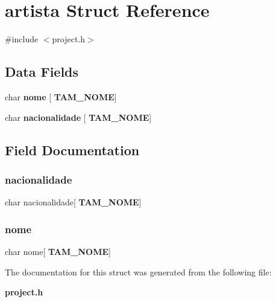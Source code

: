 \section{artista Struct Reference}
\label{structartista}


{\ttfamily \#include $<$project.\+h$>$}

\subsection*{Data Fields}
\begin{DoxyCompactItemize}
\item 
char \textbf{ nome} [\textbf{ T\+A\+M\+\_\+\+N\+O\+ME}]
\item 
char \textbf{ nacionalidade} [\textbf{ T\+A\+M\+\_\+\+N\+O\+ME}]
\end{DoxyCompactItemize}


\subsection{Field Documentation}
\mbox{\label{structartista_a1ea0358b1dadca215efb6586f6714271}} 
\subsubsection{nacionalidade}
{\footnotesize\ttfamily char nacionalidade[\textbf{ T\+A\+M\+\_\+\+N\+O\+ME}]}

\mbox{\label{structartista_a69b32c1c4f965a4119eabc9f94886621}} 
\subsubsection{nome}
{\footnotesize\ttfamily char nome[\textbf{ T\+A\+M\+\_\+\+N\+O\+ME}]}



The documentation for this struct was generated from the following file\+:\begin{DoxyCompactItemize}
\item 
\textbf{ project.\+h}\end{DoxyCompactItemize}
